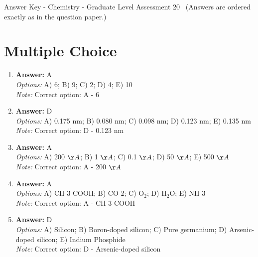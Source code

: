 \documentclass[12pt]{article}
\begin{document}
\begin{center}
Answer Key - Chemistry - Graduate Level Assessment 20 \
\small (Answers are ordered exactly as in the question paper.)
\end{center}

\section*{Multiple Choice}
\begin{enumerate}[label=\arabic*.]
\item \textbf{Answer:} A
\\ \textit{Options:} A) 6; B) 9; C) 2; D) 4; E) 10
\\ \textit{Note:} Correct option: A - 6
\item \textbf{Answer:} D
\\ \textit{Options:} A) 0.175 nm; B) 0.080 nm; C) 0.098 nm; D) 0.123 nm; E) 0.135 nm
\\ \textit{Note:} Correct option: D - 0.123 nm
\item \textbf{Answer:} A
\\ \textit{Options:} A) 200 \ensuremath{\AA}; B) 1 \ensuremath{\AA}; C) 0.1 \ensuremath{\AA}; D) 50 \ensuremath{\AA}; E) 500 \ensuremath{\AA}
\\ \textit{Note:} Correct option: A - 200 \ensuremath{\AA}
\item \textbf{Answer:} A
\\ \textit{Options:} A) CH 3 COOH; B) CO 2; C) O$_{2}$; D) H$_{2}$O; E) NH 3
\\ \textit{Note:} Correct option: A - CH 3 COOH
\item \textbf{Answer:} D
\\ \textit{Options:} A) Silicon; B) Boron-doped silicon; C) Pure germanium; D) Arsenic-doped silicon; E) Indium Phosphide
\\ \textit{Note:} Correct option: D - Arsenic-doped silicon
\end{enumerate}
\end{document}
